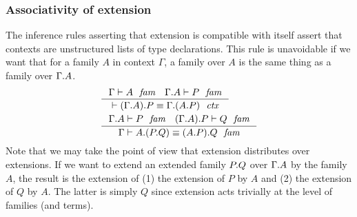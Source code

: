 \subsubsection{Associativity of extension}
\label{comp-ee}
The inference rules asserting that extension is compatible with itself assert
that contexts are unstructured lists of type declarations. This rule is
unavoidable if we want that for a family $A$ in context $\Gamma$, a family over
$A$ is the same thing as a family over $\ctxext{\Gamma}{A}$. 
\begin{align}
& \inference
  { \jfam{\Gamma}{A}
    \jfam{{\Gamma}{A}}{P}
    }
  { \jctxeq{\ctxext{{\Gamma}{A}}{P}}{\ctxext{\Gamma}{{A}{P}}}
    }
  \\
& \inference
  { \jfam{{\Gamma}{A}}{P}
    \jfam{{{\Gamma}{A}}{P}}{Q}
    }
  { \jfameq{\Gamma}{\ctxext{A}{{P}{Q}}}{\ctxext{{A}{P}}{Q}}
    }
  \label{comp-ee-c}
\end{align}
Note that we may take the point of view that extension distributes over
extensions. If we want to extend an extended family $\ctxext{P}{Q}$ over
$\ctxext{\Gamma}{A}$ by the family $A$, the result is the extension of (1)
the extension of $P$ by $A$ and (2) the extension of $Q$ by $A$. The latter is
simply $Q$ since extension acts trivially at the level of families (and terms).
